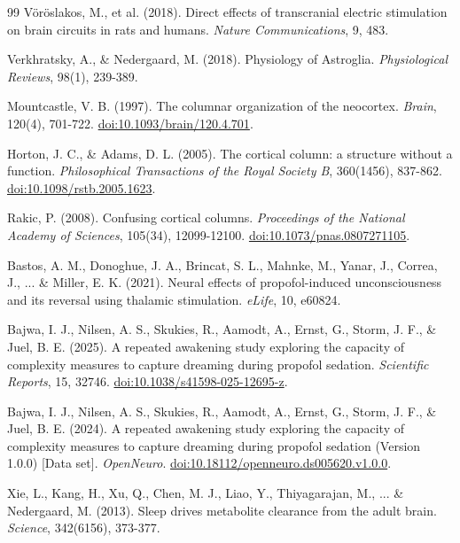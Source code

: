 \begin{thebibliography}{99}
 V\"or\"oslakos, M., et al. (2018). Direct effects of transcranial electric stimulation on brain circuits in rats and humans. \textit{Nature Communications}, 9, 483.

 Verkhratsky, A., \& Nedergaard, M. (2018). Physiology of Astroglia. \textit{Physiological Reviews}, 98(1), 239-389.

 Mountcastle, V. B. (1997). The columnar organization of the neocortex. \textit{Brain}, 120(4), 701-722. \href{https://doi.org/10.1093/brain/120.4.701}{doi:10.1093/brain/120.4.701}.

 Horton, J. C., \& Adams, D. L. (2005). The cortical column: a structure without a function. \textit{Philosophical Transactions of the Royal Society B}, 360(1456), 837-862. \href{https://doi.org/10.1098/rstb.2005.1623}{doi:10.1098/rstb.2005.1623}.

 Rakic, P. (2008). Confusing cortical columns. \textit{Proceedings of the National Academy of Sciences}, 105(34), 12099-12100. \href{https://doi.org/10.1073/pnas.0807271105}{doi:10.1073/pnas.0807271105}.

 Bastos, A. M., Donoghue, J. A., Brincat, S. L., Mahnke, M., Yanar, J., Correa, J., ... \& Miller, E. K. (2021). Neural effects of propofol-induced unconsciousness and its reversal using thalamic stimulation. \textit{eLife}, 10, e60824.

   Bajwa, I. J., Nilsen, A. S., Skukies, R., Aamodt, A., Ernst, G., Storm, J. F., \& Juel, B. E. (2025). A repeated awakening study exploring the capacity of complexity measures to capture dreaming during propofol sedation. \textit{Scientific Reports}, 15, 32746. \href{https://doi.org/10.1038/s41598-025-12695-z}{doi:10.1038/s41598-025-12695-z}.

   Bajwa, I. J., Nilsen, A. S., Skukies, R., Aamodt, A., Ernst, G., Storm, J. F., \& Juel, B. E. (2024). A repeated awakening study exploring the capacity of complexity measures to capture dreaming during propofol sedation (Version 1.0.0) [Data set]. \textit{OpenNeuro}. \href{https://doi.org/10.18112/openneuro.ds005620.v1.0.0}{doi:10.18112/openneuro.ds005620.v1.0.0}.

 Xie, L., Kang, H., Xu, Q., Chen, M. J., Liao, Y., Thiyagarajan, M., ... \& Nedergaard, M. (2013). Sleep drives metabolite clearance from the adult brain. \textit{Science}, 342(6156), 373-377.


\end{thebibliography}
